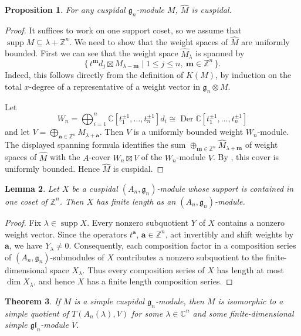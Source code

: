 \documentclass[12pt,a4paper]{amsart}
\def\mg{g}%
\def\gl{gl}%
\newtheorem{theorem}{Theorem}[section]
\newtheorem{lemma}[theorem]{Lemma}%
\newtheorem{proposition}[theorem]{Proposition}%
\numberwithin{equation}{section}
\newcommand{\C}{\mathbb C}
\newcommand{\Z}{\mathbb{Z}}
\def\mg{\mathfrak{g}}
\def\gl{\mathfrak{gl}}
\def\ba{\mathbf{a}}
\def\bm{\mathbf{m}}
\begin{document}
\begin{proposition}\label{M-hat}
For any  cuspidal $\mg_n$-module $M$,
$\widehat{M}$ is cuspidal.
\end{proposition}

\begin{proof}
It suffices to work on one support coset, so we assume that
\(\operatorname{supp}M\subseteq\lambda+\Z^n\).
We need to show that the weight spaces of $\widehat{M}$
are uniformly bounded.
First we can see that the weight space
\(\widehat M_\lambda\) is spanned by
\[
\{\,t^\bm d_{j}\boxtimes M_{\lambda-\bm}
\mid 1\leq j\leq n,\ \bm\in\Z^n\,\}.
\]
Indeed, this follows directly from the definition of \(K(M)\), by
induction on the total \(x\)-degree of a representative of a
weight vector in \(\mg_n\otimes M\).

 Let
\[
W_n=\bigoplus_{i=1}^n
\C[t_1^{\pm1},\ldots,t_n^{\pm1}]d_i
\cong\operatorname{Der}
\C[t_1^{\pm1},\ldots,t_n^{\pm1}]
\]
and let \(V=\bigoplus_{\ba\in\Z^n}M_{\lambda+\ba}\). Then \(V\) is a
uniformly bounded weight \(W_n\)-module. The displayed spanning formula
identifies the sum \(\oplus_{\bm\in \Z^n}\widehat M_{\lambda+\bm}\) of  weight spaces of \(\widehat M\) with
the \(A\)-cover \(W_n\boxtimes V\) of the $W_n$-module $V$. By
\cite[Theorem~4.8]{BF1}, this cover is uniformly bounded. Hence
\(\widehat M\) is cuspidal.
\end{proof}

\begin{lemma}\label{lem:finite-length-cover}
Let \(X\) be a cuspidal \((A_n,\mg_n)\)-module whose support is
contained in one coset of \(\Z^n\). Then \(X\) has finite length as an
\((A_n,\mg_n)\)-module.
\end{lemma}

\begin{proof}
Fix \(\lambda\in\operatorname{supp}X\). Every nonzero subquotient
\(Y\) of \(X\) contains a nonzero weight vector. Since the
operators \(t^\ba\), \(\ba\in\Z^n\), act invertibly and shift weights
by \(\ba\), we have  \(Y_\lambda\neq0\). Consequently, each composition
factor in a composition series of \((A_n,\mg_n)\)-submodules of $X$ contributes a nonzero
subquotient to the finite-dimensional space \(X_\lambda\). Thus every
composition series of $X$ has length at most \(\dim X_\lambda\), and hence \(X\) has a finite length
composition series.
\end{proof}





\begin{theorem}\label{cuspidal}
If \(M\) is a simple cuspidal \(\mg_n\)-module, then \(M\) is
isomorphic to a simple quotient of \(T(A_n(\lambda),V)\) for some
\(\lambda\in\C^n\) and some finite-dimensional simple
\(\gl_n\)-module \(V\).
\end{theorem}
\end{document}
